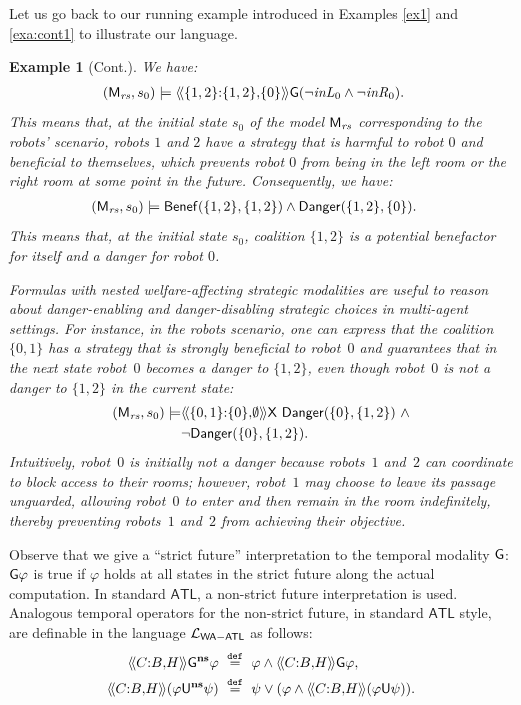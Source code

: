 \documentclass{article}
\newtheorem{example}{Example}
\begin{document}
Let us go back 
to our running example introduced in Examples 
\ref{ex1}
and 
\ref{exa:cont1}
to illustrate our language.
\begin{example}[Cont.]
We have:
\begin{align*}
  &  (\mathsf{M}_{\mathit{rs}}, s_0)\models
    \langle\!\langle \{1,2 \}{:}\{1,2\}{,}\{0\}  \rangle\!\rangle
     \mathsf{G} (\neg \mathit{inL}_0 \wedge \neg  \mathit{inR}_0 ). 
\end{align*}
This means that, at the initial state $s_0$ of the model $\mathsf{M}_{\mathit{rs}}$ corresponding to the robots' scenario, 
robots $1$ and $2$ have a strategy that is harmful to robot $0$ and beneficial to themselves, 
which prevents robot $0$ from being in the left room or the right room at some point in the future.
Consequently, we have:
\begin{align*}
  &  (\mathsf{M}_{\mathit{rs}}, s_0)\models
   \mathsf{Benef}(\{1,2 \}, \{1,2 \})
   \wedge 
      \mathsf{Danger}(\{1,2 \}, \{0 \}).
\end{align*}
This means that, at the initial state $s_0$, 
coalition $\{1,2\}$ is a potential benefactor for itself and a danger for robot $0$.



Formulas with nested  welfare-affecting strategic modalities are useful to reason about danger-enabling and danger-disabling strategic choices in multi-agent settings. For instance, in the robots scenario, one can express that the coalition $\{0,1\}$ has a strategy that is strongly beneficial to robot~$0$ and guarantees that in the next state robot~$0$ becomes a danger to $\{1,2\}$, even though robot~$0$ is not a danger to $\{1,2\}$ in the current state:
\begin{align*}
(\M_{\mathit{rs}}, s_0)\models & \atlbh{\{0,1\}}{\{0\}}{\emptyset}\nexttime \ \mathsf{Danger}(\{0\},\{1,2\})
\ \wedge \\
& \neg \mathsf{Danger}(\{0\},\{1,2\}).
\end{align*} 
Intuitively, robot~$0$ is initially not a danger because robots~$1$ and~$2$ can coordinate to block access to their rooms; however, robot~$1$ may choose to leave its passage unguarded, allowing robot~$0$ to enter and then remain in the room indefinitely, thereby preventing robots~$1$ and~$2$ from achieving their objective.  
\end{example}


Observe that we give a ``strict future'' interpretation to the temporal modality $\mathsf{G}$: 
$\mathsf{G} \varphi$ is true if $\varphi$ holds at all states in the strict future along the actual computation. 
In standard $\mathsf{ATL}$, a non-strict future interpretation is used. 
Analogous temporal operators for the non-strict future, in standard $\mathsf{ATL}$ style, are definable in the language $\mathcal{L}_{\mathsf{WA{-}ATL}}$ as follows:
\begin{align*}
    \atlbh{\Coalition}{B}{H} \G^\ns \varphi &\eqdef \varphi \wedge \atlbh{\Coalition}{B}{H} \G \varphi,\\
    \atlbh{\Coalition}{B}{H} (\varphi \U^\ns \psi) &\eqdef \psi \vee (\varphi \wedge \atlbh{\Coalition}{B}{H} (\varphi \U \psi)).
\end{align*}
\end{document}
